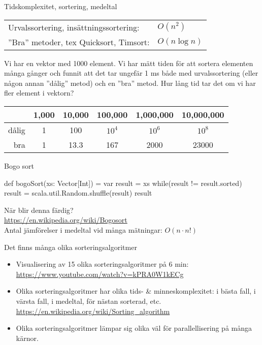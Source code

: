 \begin{Slide}{Tidskomplexitet, sortering, medeltal}
\begin{tabular}{ll}
Urvalssortering, insättningssortering: & $O(n^2)$ \\
''Bra'' metoder, tex Quicksort, Timsort:  & $O(n\log n)$
\end{tabular}

\vspace{1em}\footnotesize
Vi har en vektor med 1000 element. Vi har mätt tiden för att sortera elementen många gånger och funnit att det tar ungefär 1 ms både med urvalssortering (eller någon annan ''dålig'' metod) och en ''bra'' metod. Hur lång tid tar det om vi har fler element i vektorn?

\vspace{1em}
\begin{tabular}{rccccc}
       & 1,000 & 10,000 & 100,000 & 1,000,000 & 10,000,000 \\ \hline
dålig  & 1     & 100    & $10^4$  & $10^6$   & $10^8$ \\
bra    & 1     & 13.3   & 167     & 2000     & 23000
\end{tabular}
\end{Slide}

\begin{Slide}{Bogo sort}
\begin{Code}
def bogoSort(xs: Vector[Int]) = {
  var result = xs
  while(result != result.sorted) {
    result = scala.util.Random.shuffle(result)
  }
  result
}
\end{Code}
När blir denna färdig? \pause \\
\url{https://en.wikipedia.org/wiki/Bogosort}\\
Antal jämförelser i medeltal vid många mätningar: $ O(n \cdot n!) $
\end{Slide}





\begin{Slide}{Det finns många olika sorteringsalgoritmer}
\begin{itemize}
\item Visualisering av 15 olika sorteringsalgoritmer på 6 min:\\{\SlideFontSmall\url{https://www.youtube.com/watch?v=kPRA0W1kECg}}
\item Olika sorteringsalgoritmer har olika tids- \& minneskomplexitet: i bästa fall, i värsta fall, i medeltal, för nästan sorterad, etc.
\\{\SlideFontSmall\url{https://en.wikipedia.org/wiki/Sorting_algorithm}}
\item Olika sorteringsalgoritmer lämpar sig olika väl för parallellisering på många kärnor.
\end{itemize}
\end{Slide}




